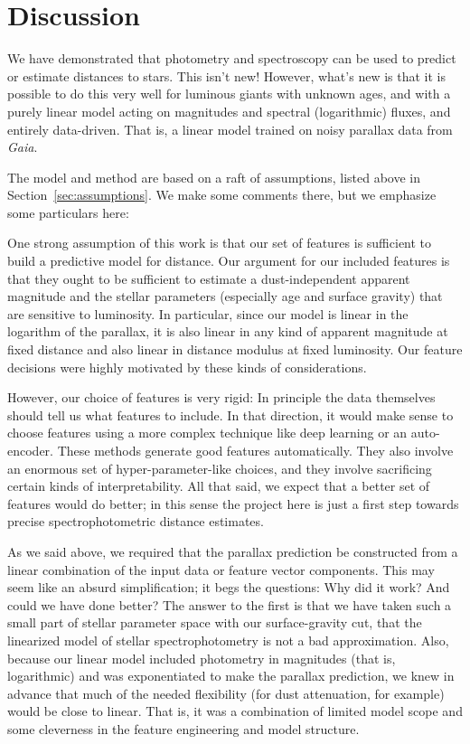 \documentclass[modern]{aastex62}
\newcommand{\sectionname}{Section}
\newcommand{\project}[1]{\textsl{#1}}
\newcommand{\gaia}{\project{Gaia}}
\begin{document}
\section{Discussion}

We have demonstrated that photometry and spectroscopy can be used to predict
or estimate distances to stars.
This isn't new!
However, what's new is that it is possible to do this very well for luminous giants
with unknown ages, and with a purely
linear model acting on magnitudes and spectral (logarithmic) fluxes, and entirely
data-driven.
That is, a linear model trained on noisy parallax data from \gaia.

The model and method are based on a raft of assumptions, listed above
in \sectionname~\ref{sec:assumptions}.
We make some comments there, but we emphasize some particulars here:

One strong assumption of this work is that our set of features is sufficient to
build a predictive model for distance.
Our argument for our included features is that they ought to be sufficient to
estimate a dust-independent apparent magnitude and the stellar parameters (especially
age and surface gravity) that are sensitive to luminosity.
In particular, since our model is linear in the logarithm of the parallax, it is
also linear in any kind of apparent magnitude at fixed distance and also linear
in distance modulus at fixed luminosity.
Our feature decisions were highly motivated by these kinds of considerations.

However, our choice of features is very rigid:
In principle the data themselves should tell us what features to include.
In that direction, it would make sense to choose features using a more complex
technique like deep learning or an auto-encoder.
These methods generate good features automatically.
They also involve an enormous set of hyper-parameter-like choices,
and they involve sacrificing certain kinds of interpretability.
All that said, we expect that a better set of features would do better; in this sense
the project here is just a first step towards precise spectrophotometric distance
estimates.

As we said above,
we required that the parallax prediction be constructed from a linear combination
of the input data or feature vector components.
This may seem like an absurd simplification; it begs the questions:
Why did it work? And could we have done better?
The answer to the first is that we have taken such a small part of stellar parameter
space with our surface-gravity cut, that the linearized model of stellar
spectrophotometry is not a bad approximation.
Also, because our linear model included photometry in magnitudes (that is, logarithmic)
and was exponentiated to make the parallax prediction, we knew in advance that much
of the needed flexibility (for dust attenuation, for example) would be close to
linear.
That is, it was a combination of limited model scope and some cleverness in the
feature engineering and model structure.
\end{document}
